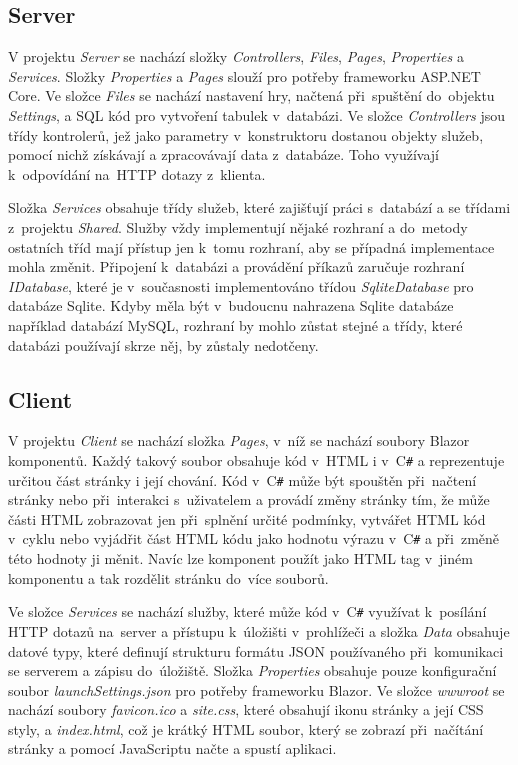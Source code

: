 \documentclass[a4paper,12pt]{article}
\def\CS{C\texttt{\#}}
\begin{document}
\subsection{Server}
V projektu \textit{Server} se nachází složky \textit{Controllers}, \textit{Files}, \textit{Pages}, \textit{Properties} a \textit{Services}. Složky \textit{Properties} a \textit{Pages} slouží pro potřeby frameworku ASP.NET Core. Ve složce \textit{Files} se nachází nastavení hry, načtená při~spuštění do~objektu \textit{Settings}, a SQL kód pro vytvoření tabulek v~databázi. Ve složce \textit{Controllers} jsou třídy kontrolerů, jež jako parametry v~konstruktoru dostanou objekty služeb, pomocí nichž získávají a zpracovávají data z~databáze. Toho využívají k~odpovídání na~HTTP dotazy z~klienta.

Složka \textit{Services} obsahuje třídy služeb, které zajišťují práci s~databází a se třídami z~projektu \textit{Shared}. Služby vždy implementují nějaké rozhraní a do~metody ostatních tříd mají přístup jen k~tomu rozhraní, aby se případná implementace mohla změnit. Připojení k~databázi a provádění příkazů zaručuje rozhraní \textit{IDatabase}, které je v~současnosti implementováno třídou \textit{SqliteDatabase} pro databáze Sqlite. Kdyby měla být v~budoucnu nahrazena Sqlite databáze například databází MySQL, rozhraní by mohlo zůstat stejné a třídy, které databázi používají skrze něj, by zůstaly nedotčeny.

\subsection{Client}
V projektu \textit{Client} se nachází složka \textit{Pages}, v~níž se nachází soubory Blazor komponentů. Každý takový soubor obsahuje kód v~HTML i v~\CS{} a reprezentuje určitou část stránky i její chování. Kód v~\CS{} může být spouštěn při~načtení stránky nebo při~interakci s~uživatelem a provádí změny stránky tím, že může části HTML zobrazovat jen při~splnění určité podmínky, vytvářet HTML kód v~cyklu nebo vyjádřit část HTML kódu jako hodnotu výrazu v~\CS{} a při~změně této hodnoty ji měnit. Navíc lze komponent použít jako HTML tag v~jiném komponentu a tak rozdělit stránku do~více souborů.

Ve složce \textit{Services} se nachází služby, které může kód v~\CS{} využívat k~posílání HTTP dotazů na~server a přístupu k~úložišti v~prohlížeči a složka \textit{Data} obsahuje datové typy, které definují strukturu formátu JSON používaného při~komunikaci se serverem a zápisu do~úložiště. Složka \textit{Properties} obsahuje pouze konfigurační soubor \textit{launchSettings.json} pro potřeby frameworku Blazor. Ve složce \textit{wwwroot} se nachází soubory \textit{favicon.ico} a \textit{site.css}, které obsahují ikonu stránky a její CSS styly, a \textit{index.html}, což je krátký HTML soubor, který se zobrazí při~načítání stránky a pomocí JavaScriptu načte a spustí aplikaci.

\newpage
\printbibliography[heading=bibintoc, title={Použitá literatura}]
\newpage
\listoffigures
\end{document}
